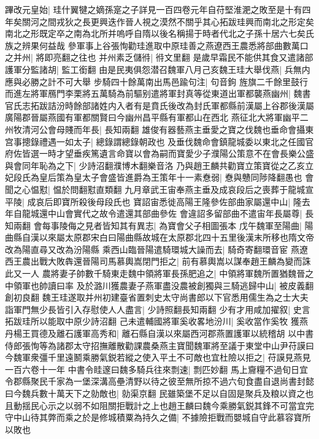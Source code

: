 蹕改元皇始|{
	珪什翼犍之嫡孫寔之子詳見一百四卷元年自苻堅淮淝之敗至是十有四年矣關河之間戎狄之長更興迭作晉人視之漠然不關乎其心拓跋珪興而南北之形定矣南北之形既定卒之南為北所并嗚呼自隋以後名稱揚于時者代北之子孫十居六七矣氏族之辨果何益哉}
參軍事上谷張恂勸珪進取中原珪善之燕遼西王農悉將部曲數萬口之并州|{
	將即亮翻之往也}
并州素乏儲㣥|{
	㣥文里翻}
是歲早霜民不能供其食又遣諸部護軍分監諸胡|{
	監工銜翻}
由是民夷俱怨潜召魏軍八月己亥魏王珪大舉伐燕|{
	兵無内應與必勝之計不可大舉}
步騎四十餘萬南出馬邑踰句注|{
	句音鉤}
旌旗二千餘里鼓行而進左將軍鴈門李栗將五萬騎為前驅别遣將軍封真等從東道出軍都襲燕幽州|{
	魏書官氏志拓跋詰汾時餘部諸姓内入者有是賁氏後改為封氏軍都縣前漢屬上谷郡後漢屬廣陽郡晉屬燕國有軍都關賢曰今幽州昌平縣有軍都山在西北}
燕征北大將軍幽平二州牧清河公會母賤而年長|{
	長知兩翻}
雄俊有器藝燕主垂愛之寶之伐魏也垂命會攝東宫事摠錄禮遇一如太子|{
	總錄謂總錄朝政也}
及垂伐魏命會鎮龍城委以東北之任國官府佐皆選一時才望垂疾篤遺言命寶以會為嗣而寶愛少子濮陽公策意不在會長樂公盛與會同年恥為之下|{
	少詩沼翻濮博木翻樂音洛}
乃與趙王麟共勸寶立策寶從之乙亥立妃段氏為皇后策為皇太子會盛皆進爵為王策年十一素憃弱|{
	憃與戇同陟降翻愚也}
會聞之心愠懟|{
	愠於問翻懟直類翻}
九月章武王宙奉燕主垂及成哀段后之喪葬于龍城宣平陵|{
	成哀后即寶所殺後母段氏也}
寶詔宙悉徙高陽王隆參佐部曲家屬還中山|{
	隆去年自龍城還中山會實代之故令遣還其部曲參佐}
會違詔多留部曲不遣宙年長屬尊|{
	長知兩翻}
會每事陵侮之見者皆知其有異志|{
	為寶會父子相圖張本}
戊午魏軍至陽曲|{
	陽曲縣自漢以來屬太原郡宋白曰陽曲縣故城在太原郡北四十五里後漢末所移也隋文帝改為陽直尋又改為汾陽縣}
乘西山臨晉陽遣騎環城大譟而去|{
	騎奇寄翻環音宦}
燕遼西王農出戰大敗犇還晉陽司馬慕輿嵩閉門拒之|{
	前有慕輿嵩以謀奉趙王麟為變而誅此又一人}
農將妻子帥數千騎東走魏中領將軍長孫肥追之|{
	中領將軍魏所置猶魏晉之中領軍也帥讀曰率}
及於潞川獲農妻子燕軍盡没農被創獨與三騎逃歸中山|{
	被皮義翻創初良翻}
魏王珪遂取并州初建臺省置刺史太守尚書郎以下官悉用儒生為之士大夫詣軍門無少長皆引入存慰使人人盡言|{
	少詩照翻長知兩翻}
少有才用咸加擢叙|{
	史言拓跋珪所以能取中原少詩沼翻}
己未遣輔國將軍奚收畧地汾川|{
	奚收當作奚牧}
獲燕丹楊王買德及離石護軍高秀和|{
	離石縣自漢以來屬西河郡燕置護軍以統稽胡}
以中書侍郎張恂等為諸郡太守招撫離散勸課農桑燕主寶聞魏軍將至議于東堂中山尹苻謨曰今魏軍衆彊千里遠鬭乘勝氣鋭若縱之使入平土不可敵也宜杜險以拒之|{
	苻謨見燕見一百六卷十一年}
中書令眭邃曰魏多騎兵往來剽速|{
	剽匹妙翻}
馬上齎糧不過旬日宜令郡縣聚民千家為一堡深溝高壘清野以待之彼至無所掠不過六旬食盡自退尚書封懿曰今魏兵數十萬天下之勍敵也|{
	勍渠京翻}
民雖築堡不足以自固是聚兵及粮以資之也且動揺民心示之以弱不如阻關拒戰計之上也趙王麟曰魏今乘勝氣鋭其鋒不可當宜完守中山待其弊而乘之於是修城積粟為持久之備|{
	不據險拒戰而嬰城自守此慕容寶所以敗也}
